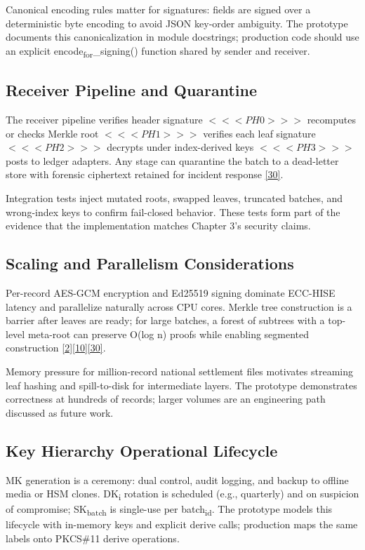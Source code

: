 \indent Canonical encoding rules matter for signatures: fields are signed over a deterministic byte encoding to avoid JSON key-order ambiguity. The prototype documents this canonicalization in module docstrings; production code should use an explicit encode\textsubscript{for}\_signing() function shared by sender and receiver.

\subsection{Receiver Pipeline and Quarantine}

\indent The receiver pipeline verifies header signature $<<<PH0>>>$ recomputes or checks Merkle root $<<<PH1>>>$ verifies each leaf signature $<<<PH2>>>$ decrypts under index-derived keys $<<<PH3>>>$ posts to ledger adapters. Any stage can quarantine the batch to a dead-letter store with forensic ciphertext retained for incident response \hyperref[ref:30]{[30]}.

\indent Integration tests inject mutated roots, swapped leaves, truncated batches, and wrong-index keys to confirm fail-closed behavior. These tests form part of the evidence that the implementation matches Chapter 3's security claims.

\subsection{Scaling and Parallelism Considerations}

\indent Per-record AES-GCM encryption and Ed25519 signing dominate ECC-HISE latency and parallelize naturally across CPU cores. Merkle tree construction is a barrier after leaves are ready; for large batches, a forest of subtrees with a top-level meta-root can preserve O(log n) proofs while enabling segmented construction \hyperref[ref:2]{[2]}\hyperref[ref:10]{[10]}\hyperref[ref:30]{[30]}.

\indent Memory pressure for million-record national settlement files motivates streaming leaf hashing and spill-to-disk for intermediate layers. The prototype demonstrates correctness at hundreds of records; larger volumes are an engineering path discussed as future work.

\subsection{Key Hierarchy Operational Lifecycle}

\indent MK generation is a ceremony: dual control, audit logging, and backup to offline media or HSM clones. DK\textsubscript{i} rotation is scheduled (e.g., quarterly) and on suspicion of compromise; SK\textsubscript{batch} is single-use per batch\textsubscript{id}. The prototype models this lifecycle with in-memory keys and explicit derive calls; production maps the same labels onto PKCS\#11 derive operations.

